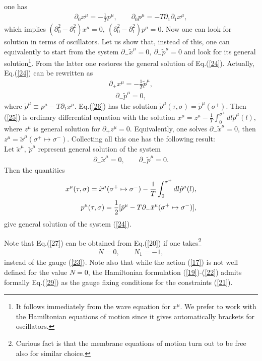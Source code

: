 \documentclass[a4paper]{article}
\begin{document}
one has 
\begin{eqnarray}\label{24}
\partial_0x^\mu=-\frac{1}{T}p^\mu, \qquad
\partial_0p^\mu=-T\partial_1\partial_1x^\mu,
\end{eqnarray}
which implies $(\partial_0^2-\partial_1^2)x^\mu=0, ~ 
(\partial_0^2-\partial_1^2)p^\mu=0$. Now one can look for solution in 
terms of oscillators. Let us show that, instead of this, one can 
equivalently to start from the system $\partial_-\tilde x^\mu=0, ~ 
\partial_-\tilde p^\mu=0$ and look for its general 
solution\footnote{It follows immediately from the wave equation for 
$x^\mu$. We prefer to work with the Hamiltonian equations of motion 
since it gives automatically brackets for oscillators.}. From the 
latter one restores the general solution of Eq.(\ref{24}). Actually, 
Eq.(\ref{24}) can be rewritten as 
\begin{eqnarray}\label{25}
\partial_+x^\mu=-\frac{1}{T}\tilde p^\mu,
\end{eqnarray}
\begin{eqnarray}\label{26}
\partial_-\tilde p^\mu=0,
\end{eqnarray} 
where $\tilde p^\mu\equiv p^\mu-T\partial_1x^\mu$. Eq.(\ref{26}) has 
the solution $\tilde p^\mu(\tau, \sigma)=\tilde p^\mu(\sigma^+)$. 
Then (\ref{25}) is ordinary differential equation with the solution 
$x^\mu=z^\mu-\frac{1}{T}\int_{0}^{\sigma^+}dl\tilde p^\mu(l)$, where 
$z^\mu$ is general solution for $\partial_+z^\mu=0$. Equivalently, one 
solves $\partial_-\tilde x^\mu=0$, then $z^\mu=\tilde x^\mu
(\sigma^+\mapsto\sigma^-)$. Collecting all this one has the following 
result: \\
Let $\tilde x^\mu, ~ \tilde p^\mu$ represent general solution of 
the system
\begin{eqnarray}\label{27}
\partial_-\tilde x^\mu=0, \qquad 
\partial_-\tilde p^\mu=0. 
\end{eqnarray}
Then the quantities
\begin{eqnarray}\label{28}
x^\mu(\tau, \sigma)=\tilde x^\mu(\sigma^+\mapsto\sigma^-)-
\frac{1}{T}\int_{0}^{\sigma^+}dl\tilde p^\mu(l), \cr 
p^\mu(\tau, \sigma)=\frac 12[\tilde p^\mu-T\partial_-\tilde x^\mu
(\sigma^+\mapsto\sigma^-)],
\end{eqnarray}
give general solution of the system (\ref{24}).

Note that Eq.(\ref{27}) can be obtained from Eq.(\ref{20}) if one 
takes\footnote{Curious fact is that the membrane equations of motion 
turn out to be free also for similar choice.} 
\begin{eqnarray}\label{29}
N=0, \qquad N_1=-1,
\end{eqnarray}
instead of the gauge (\ref{23}). Note also that while the action 
(\ref{17}) is not well defined for the value $N=0$, the Hamiltonian 
formulation (\ref{19})-(\ref{22}) admits formally Eq.(\ref{29}) as 
the gauge fixing conditions for the constraints (\ref{21}).
\end{document}
